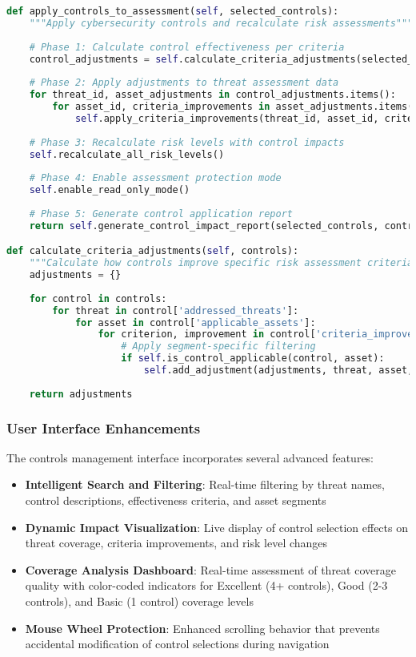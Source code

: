 \documentclass[binding=0.6cm]{sapthesis}
\begin{document}
\begin{lstlisting}[language=Python, caption=Control Application Workflow]
def apply_controls_to_assessment(self, selected_controls):
    """Apply cybersecurity controls and recalculate risk assessments"""
    
    # Phase 1: Calculate control effectiveness per criteria
    control_adjustments = self.calculate_criteria_adjustments(selected_controls)
    
    # Phase 2: Apply adjustments to threat assessment data
    for threat_id, asset_adjustments in control_adjustments.items():
        for asset_id, criteria_improvements in asset_adjustments.items():
            self.apply_criteria_improvements(threat_id, asset_id, criteria_improvements)
    
    # Phase 3: Recalculate risk levels with control impacts
    self.recalculate_all_risk_levels()
    
    # Phase 4: Enable assessment protection mode
    self.enable_read_only_mode()
    
    # Phase 5: Generate control application report
    return self.generate_control_impact_report(selected_controls, control_adjustments)

def calculate_criteria_adjustments(self, controls):
    """Calculate how controls improve specific risk assessment criteria"""
    adjustments = {}
    
    for control in controls:
        for threat in control['addressed_threats']:
            for asset in control['applicable_assets']:
                for criterion, improvement in control['criteria_improvements'].items():
                    # Apply segment-specific filtering
                    if self.is_control_applicable(control, asset):
                        self.add_adjustment(adjustments, threat, asset, criterion, improvement)
    
    return adjustments
\end{lstlisting}

\subsubsection{User Interface Enhancements}

The controls management interface incorporates several advanced features:

\begin{itemize}
\item \textbf{Intelligent Search and Filtering}: Real-time filtering by threat names, control descriptions, effectiveness criteria, and asset segments
\item \textbf{Dynamic Impact Visualization}: Live display of control selection effects on threat coverage, criteria improvements, and risk level changes
\item \textbf{Coverage Analysis Dashboard}: Real-time assessment of threat coverage quality with color-coded indicators for Excellent (4+ controls), Good (2-3 controls), and Basic (1 control) coverage levels
\item \textbf{Mouse Wheel Protection}: Enhanced scrolling behavior that prevents accidental modification of control selections during navigation
\end{itemize}
\end{document}
